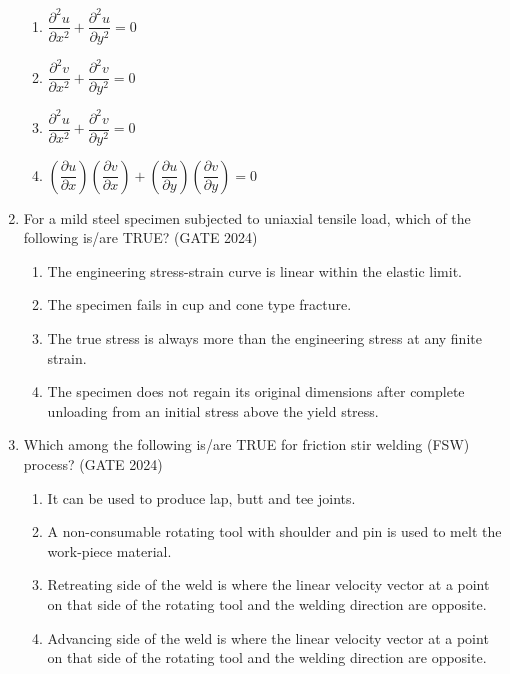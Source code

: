 \documentclass[journal,12pt,onecolumn]{IEEEtran}
\theoremstyle{remark}
\begin{document}
\begin{enumerate}
\begin{enumerate}
    \item $\dfrac{\partial^2 u}{\partial x^2} + \dfrac{\partial^2 u}{\partial y^2} = 0$
    \item $\dfrac{\partial^2 v}{\partial x^2} + \dfrac{\partial^2 v}{\partial y^2} = 0$
    \item $\dfrac{\partial^2 u}{\partial x^2} + \dfrac{\partial^2 v}{\partial y^2} = 0$
    \item $\left(\dfrac{\partial u}{\partial x}\right)\left(\dfrac{\partial v}{\partial x}\right) + \left(\dfrac{\partial u}{\partial y}\right)\left(\dfrac{\partial v}{\partial y}\right) = 0$
\end{enumerate}

\vspace{1cm}
\newpage
\item For a mild steel specimen subjected to uniaxial tensile load, which of the following is/are TRUE?
\hfill{(GATE 2024)}

\begin{enumerate}
    \item The engineering stress-strain curve is linear within the elastic limit.
    \item The specimen fails in cup and cone type fracture.
    \item The true stress is always more than the engineering stress at any finite strain.
    \item The specimen does not regain its original dimensions after complete unloading from an initial stress above the yield stress.
\end{enumerate}

\vspace{1cm}

\item Which among the following is/are TRUE for friction stir welding (FSW) process?
\hfill{(GATE 2024)}

\begin{enumerate}
    \item It can be used to produce lap, butt and tee joints.
    \item A non-consumable rotating tool with shoulder and pin is used to melt the work-piece material.
    \item Retreating side of the weld is where the linear velocity vector at a point on that side of the rotating tool and the welding direction are opposite.
    \item Advancing side of the weld is where the linear velocity vector at a point on that side of the rotating tool and the welding direction are opposite.
\end{enumerate}


\end{enumerate}
\end{document}
